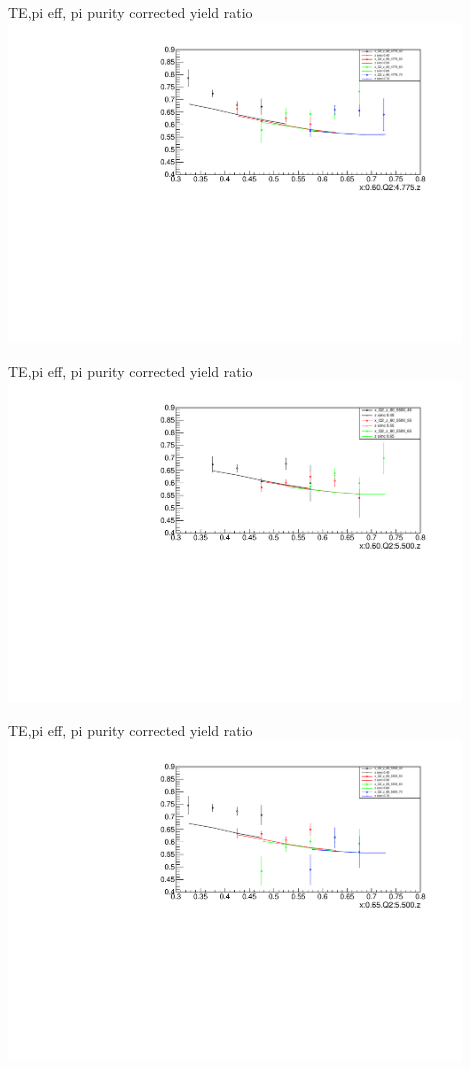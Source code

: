 \begin{frame}{TE,pi eff, pi purity corrected yield ratio}
\includegraphics[width = 0.9\textwidth]{results/yield/statistics_corr/x_Q2_60_4775_ratio.pdf}
\end{frame}
\begin{frame}{TE,pi eff, pi purity corrected yield ratio}
\includegraphics[width = 0.9\textwidth]{results/yield/statistics_corr/x_Q2_60_5500_ratio.pdf}
\end{frame}
\begin{frame}{TE,pi eff, pi purity corrected yield ratio}
\includegraphics[width = 0.9\textwidth]{results/yield/statistics_corr/x_Q2_65_5500_ratio.pdf}
\end{frame}
